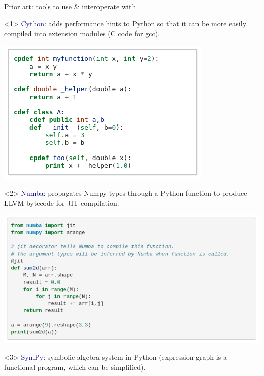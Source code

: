 \documentclass{beamer}
\begin{document}
\begin{frame}{Prior art: tools to use \& interoperate with}
\begin{onlyenv}<1>
\vspace{0.75 cm}
\textcolor{darkblue}{\Large Cython:} adds performance hints to Python so that it can be more easily compiled into extension modules (C code for gcc).

\begin{center}
\includegraphics[width=0.8\linewidth]{cython.png}
\end{center}
\end{onlyenv}
\begin{onlyenv}<2>
\vspace{0.5 cm}
\textcolor{darkblue}{\Large Numba:} propagates Numpy types through a Python function to produce LLVM bytecode for JIT compilation.

\vspace{0.2 cm}
\includegraphics[width=\linewidth]{numba.png}
\end{onlyenv}
\begin{onlyenv}<3>
\vspace{0.5 cm}
\textcolor{darkblue}{\Large SymPy:} symbolic algebra system in Python (expression graph is a functional program, which can be simplified).


\end{onlyenv}
\end{frame}
\end{document}
